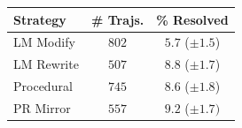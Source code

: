     \centering
    \begin{tabular}{l|cc}
\toprule
Strategy & \# Trajs. & \% Resolved \\
\midrule
LM Modify  & $802$ &  $5.7$ ($\pm1.5$) \\
LM Rewrite & $507$ &  $8.8$ ($\pm1.7$) \\
Procedural & $745$ &  $8.6$ ($\pm1.8$) \\
PR Mirror  & $557$ &  $9.2$ ($\pm1.7)$ \\
\bottomrule
    \end{tabular}
    \caption{
Comparison of training on $1000$ \bugs{} instances created with different strategies.
    }
    \label{tab:ablation_bug}
